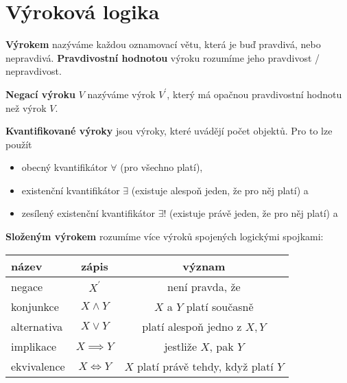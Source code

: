 \section{Výroková logika}
\begin{definition}
  \textbf{Výrokem} nazýváme každou oznamovací větu, která je buď pravdivá, nebo nepravdivá. \textbf{Pravdivostní hodnotou} výroku rozumíme jeho pravdivost / nepravdivost.
\end{definition}

\begin{definition}
  \textbf{Negací výroku} $V$ nazýváme výrok $V^\prime$, který má opačnou pravdivostní hodnotu než výrok $V$.
\end{definition}

\begin{pozn}
  \textbf{Kvantifikované výroky} jsou výroky, které uvádějí počet objektů. Pro to lze použít
  \begin{itemize}
    \item obecný kvantifikátor $\forall$ (pro všechno platí),
    \item existenční kvantifikátor $\exists$ (existuje alespoň jeden, že pro něj platí) a
    \item zesílený existenční kvantifikátor $\exists !$ (existuje právě jeden, že pro něj platí) a
  \end{itemize}
\end{pozn}

\begin{definition}
  \textbf{Složeným výrokem} rozumíme více výroků spojených logickými spojkami:
  \begin{center}
    \begin{tabular}{l | c c}
      název & zápis & význam \\
      \hline
      negace & $X^\prime$ & není pravda, že \\
      konjunkce & $X\land Y$ & $X$ a $Y$ platí současně \\
      alternativa & $X\lor Y$ & platí alespoň jedno z $X,Y$\\
      implikace & $X\implies Y$ & jestliže $X$, pak $Y$\\
      ekvivalence & $X\iff Y$ & $X$ platí právě tehdy, když platí $Y$
    \end{tabular}
  \end{center}
\end{definition}


